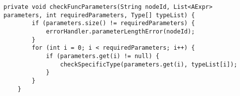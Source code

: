 \begin{lstlisting}[caption={Private helper method for verifying predefined function parameters in FuncStructureVisitor}, label={checkFuncParameters}]
    private void checkFuncParameters(String nodeId, List<AExpr> parameters, int requiredParameters, Type[] typeList) {
        if (parameters.size() != requiredParameters) {
            errorHandler.parameterLengthError(nodeId);
        }
        for (int i = 0; i < requiredParameters; i++) {
            if (parameters.get(i) != null) {
                checkSpecificType(parameters.get(i), typeList[i]);
            }
        }
    }
\end{lstlisting}